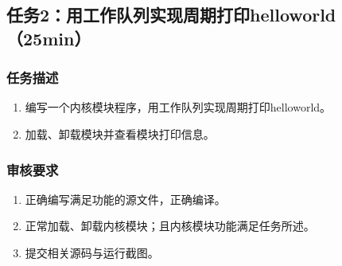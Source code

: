 \documentclass{article}
\begin{document}
\newpage
\subsection{任务2：用工作队列实现周期打印helloworld（25min）}

\subsubsection{任务描述}
\begin{enumerate}
	\item 编写一个内核模块程序，用工作队列实现周期打印helloworld。
	\item 加载、卸载模块并查看模块打印信息。
\end{enumerate}

\subsubsection{审核要求}
\begin{enumerate}
	\item 正确编写满足功能的源文件，正确编译。
	\item 正常加载、卸载内核模块；且内核模块功能满足任务所述。
	\item 提交相关源码与运行截图。
\end{enumerate}
\end{document}
